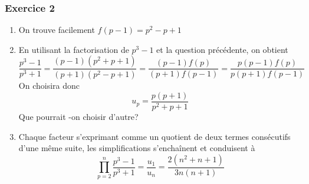 \subsubsection*{Exercice 2}
\begin{enumerate}
\item On trouve facilement $f(p-1)=p^2-p+1$
\item En utilisant la factorisation de $p^3-1$ et la question précédente, on obtient
\[\frac{ p^3-1}{ p^3+1}=\frac{(p-1)(p^2+p+1)}{(p+1)(p^2-p+1)}=\frac{(p-1)f(p)}{(p+1)f(p-1)}=\frac{p(p-1)f(p)}{p(p+1)f(p-1)}\]
On choisira donc \[u_{p}=\frac{p(p+1)}{p^2+p+1}\] Que pourrait -on choisir d'autre?
\item Chaque facteur s'exprimant comme un quotient de deux termes consécutifs d'une même suite, les simplifications s'enchaînent et conduisent à
\[\prod_{p=2}^{n}\frac{p^3-1}{p^3+1}=\frac{u_{1}}{u_{n}}=\frac{2(n^2+n+1)}{3n(n+1)}\]
\end{enumerate}
